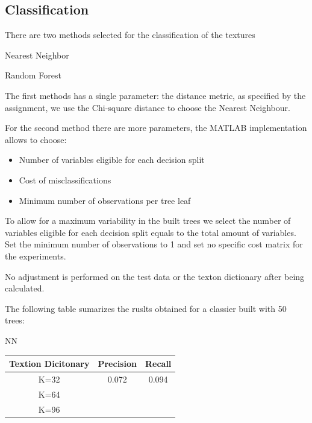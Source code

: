 \documentclass[a4paper]{article}
\begin{document}
\subsection{Classification}
There are two methods selected for the classification of the textures

\begin{description}

\item[Nearest Neighbor] \cite{}
\item[Random Forest] \cite{}

\end{description}

The first methods has a single parameter: the distance metric, as specified by the assignment, we use the Chi-square distance to choose the Nearest Neighbour.

For the second method there are more parameters, the MATLAB implementation allows to choose:

\begin{itemize}
	\item Number of variables eligible for each decision split
	\item Cost of misclassifications
	\item Minimum number of observations per tree leaf
\end{itemize}

To allow for a maximum variability in the built trees we select the number of variables eligible for each decision split equals to the total amount of variables. Set the minimum number of observations to 1 and set no specific cost matrix for the experiments.

No adjustment is performed on the test data or the texton dictionary after being calculated.

The following table sumarizes the ruslts obtained for a classier built with 50 trees:

NN
\begin{table}[t]
\centering
\begin{tabular}{c | c | c}
Textion Dicitonary & Precision & Recall   \\
\hline	
K=32 & 0.072 & 0.094 \\
K=64 & &  \\
K=96 &  &  \\

\end{tabular}
\label{table:thetable}
\end{table}
\end{document}
